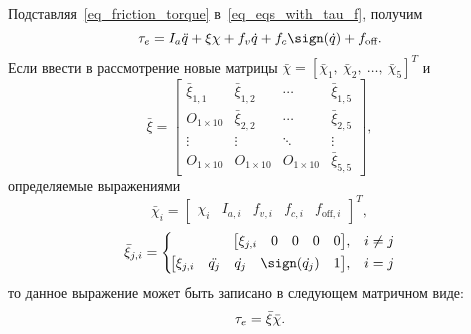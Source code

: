 Подставляя~\eqref{eq_friction_torque} в~\eqref{eq_eqs_with_tau_f}, получим
\begin{equation}
\tau_e = I_a \ddot{q} + \xi \chi + f_v \dot{q} + f_c \sign(\dot{q}) + f_\text{off}\ldotp
\end{equation}
Если ввести в рассмотрение новые матрицы $\bar{\chi}=[\bar{\chi}_1, \: \bar\chi_2, \: \ldots, \: \bar\chi_5]^T$ и\linebreak
\begin{equation}
\bar\xi =
\begin{bmatrix}
\bar\xi_{1,1} & \bar\xi_{1,2} & \cdots & \bar\xi_{1,5} \\
O_{1 \times 10} & \bar\xi_{2,2} & \cdots & \bar\xi_{2,5} \\
\vdots & \vdots & \ddots & \vdots \\
O_{1 \times 10} & O_{1 \times 10} & O_{1 \times 10} & \bar\xi_{5,5}
\end{bmatrix}\!\!,
\end{equation}
определяемые выражениями
\begin{equation}
\bar{\chi}_i =
\begin{bmatrix}
\chi_i & I_{a,i} & f_{v,i} & f_{c,i} & f_{\text{off},i}
\end{bmatrix}^T\!\!\!\!,
\end{equation}
\begin{equation}
\bar{\xi}_{j,i} =
\left\{
\begin{aligned}
\!\begin{bmatrix}\xi_{j,i} & 0 & 0 & 0 & 0\end{bmatrix}&, && i \ne j \\
\!\begin{bmatrix}\xi_{j,i} & \ddot{q_j} & \dot{q_j} & \sign(\dot{q_j}) & 1\end{bmatrix}&, &&i = j
\end{aligned}
\right.
\end{equation}
то данное выражение может быть записано в следующем матричном виде:
\begin{equation}\label{eq_extended_dynamic_in_linear}
\tau_e = \bar\xi \bar\chi \ldotp
\end{equation}




